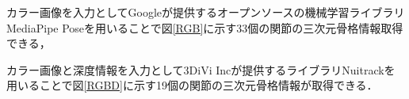 \documentclass[titlepage]{jarticle}
\begin{document}
カラー画像を入力としてGoogleが提供するオープンソースの機械学習ライブラリMediaPipe Poseを用いることで図\ref{RGB}に示す33個の関節の三次元骨格情報取得できる，

カラー画像と深度情報を入力として3DiVi Incが提供するライブラリNuitrackを用いることで図\ref{RGBD}に示す19個の関節の三次元骨格情報が取得できる．

\end{document}
